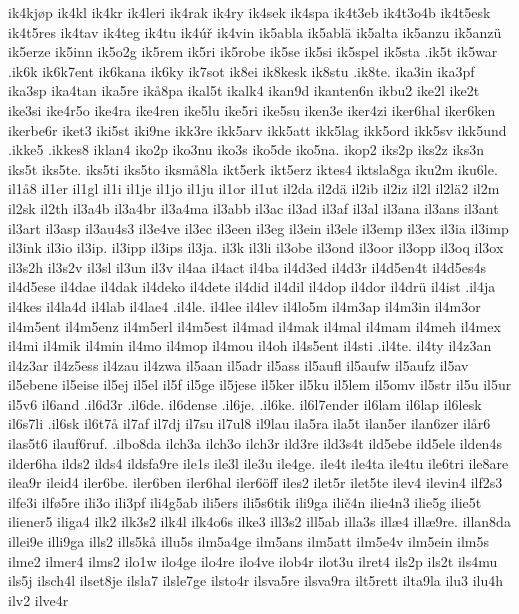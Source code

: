 {{ik4kjøp
ik4kl
ik4kr
ik4leri
ik4rak
ik4ry
ik4sek
ik4spa
ik4t3eb
ik4t3o4b
ik4t5esk
ik4t5res
ik4tav
ik4teg
ik4tu
ik4úř
ik4vin
ik5abla
ik5ablä
ik5alta
ik5anzu
ik5anzü
ik5erze
ik5inn
ik5o2g
ik5rem
ik5ri
ik5robe
ik5se
ik5si
ik5spel
ik5sta
.ik5t
ik5war
.ik6k
ik6k7ent
ik6kana
ik6ky
ik7sot
ik8ei
ik8kesk
ik8stu
.ik8te.
ika3in
ika3pf
ika3sp
ika4tan
ika5re
ikå8pa
ikal5t
ikalk4
ikan9d
ikanten6n
ikbu2
ike2l
ike2t
ike3si
ike4r5o
ike4ra
ike4ren
ike5lu
ike5ri
ike5su
iken3e
iker4zi
iker6hal
iker6ken
ikerbe6r
iket3
iki5st
iki9ne
ikk3re
ikk5arv
ikk5att
ikk5lag
ikk5ord
ikk5sv
ikk5und
.ikke5
.ikkes8
iklan4
iko2p
iko3nu
iko3s
iko5de
iko5na.
ikop2
iks2p
iks2z
iks3n
iks5t
iks5te.
iks5ti
iks5to
iksmå8la
ikt5erk
ikt5erz
iktes4
iktsla8ga
iku2m
iku6le.
il1å8
il1er
il1gl
il1i
il1je
il1jo
il1ju
il1or
il1ut
il2da
il2dä
il2ib
il2iz
il2l
il2lä2
il2m
il2sk
il2th
il3a4b
il3a4br
il3a4ma
il3abb
il3ac
il3ad
il3af
il3al
il3ana
il3ans
il3ant
il3art
il3asp
il3au4s3
il3e4ve
il3ec
il3een
il3eg
il3ein
il3ele
il3emp
il3ex
il3ia
il3imp
il3ink
il3io
il3ip.
il3ipp
il3ips
il3ja.
il3k
il3li
il3obe
il3ond
il3oor
il3opp
il3oq
il3ox
il3s2h
il3s2v
il3sl
il3un
il3v
il4aa
il4act
il4ba
il4d3ed
il4d3r
il4d5en4t
il4d5es4s
il4d5ese
il4dae
il4dak
il4deko
il4dete
il4did
il4dil
il4dop
il4dor
il4drü
il4ist
.il4ja
il4kes
il4la4d
il4lab
il4lae4
.il4le.
il4lee
il4lev
il4lo5m
il4m3ap
il4m3in
il4m3or
il4m5ent
il4m5enz
il4m5erl
il4m5est
il4mad
il4mak
il4mal
il4mam
il4meh
il4mex
il4mi
il4mik
il4min
il4mo
il4mop
il4mou
il4oh
il4s5ent
il4sti
.il4te.
il4ty
il4z3an
il4z3ar
il4z5ess
il4zau
il4zwa
il5aan
il5adr
il5ass
il5aufl
il5aufw
il5aufz
il5av
il5ebene
il5eise
il5ej
il5el
il5f
il5ge
il5jese
il5ker
il5ku
il5lem
il5omv
il5str
il5u
il5ur
il5v6
il6and
.il6d3r
.il6de.
il6dense
.il6je.
.il6ke.
il6l7ender
il6lam
il6lap
il6lesk
il6s7li
.il6sk
il6t7å
il7af
il7dj
il7su
il7ul8
il9lau
ila5ra
ila5t
ilan5er
ilan6zer
ilår6
ilas5t6
ilauf6ruf.
.ilbo8da
ilch3a
ilch3o
ilch3r
ild3re
ild3s4t
ild5ebe
ild5ele
ilden4s
ilder6ha
ilds2
ilds4
ildsfa9re
ile1s
ile3l
ile3u
ile4ge.
ile4t
ile4ta
ile4tu
ile6tri
ile8are
ilea9r
ileid4
iler6be.
iler6ben
iler6hal
iler6öff
iles2
ilet5r
ilet5te
ilev4
ilevin4
ilf2s3
ilfe3i
ilfø5re
ili3o
ili3pf
ili4g5ab
ili5ers
ili5s6tik
ili9ga
ilič4n
ilie4n3
ilie5g
ilie5t
iliener5
iliga4
ilk2
ilk3s2
ilk4l
ilk4o6s
ilke3
ill3s2
ill5ab
illa3s
illæ4
illæ9re.
illan8da
illei9e
illi9ga
ills2
ills5kå
illu5s
ilm5a4ge
ilm5ans
ilm5att
ilm5e4v
ilm5ein
ilm5s
ilme2
ilmer4
ilms2
ilo1w
ilo4ge
ilo4re
ilo4ve
ilob4r
ilot3u
ilret4
ils2p
ils2t
ils4mu
ils5j
ilsch4l
ilset8je
ilsla7
ilsle7ge
ilsto4r
ilsva5re
ilsva9ra
ilt5rett
ilta9la
ilu3
ilu4h
ilv2
ilve4r
}}
